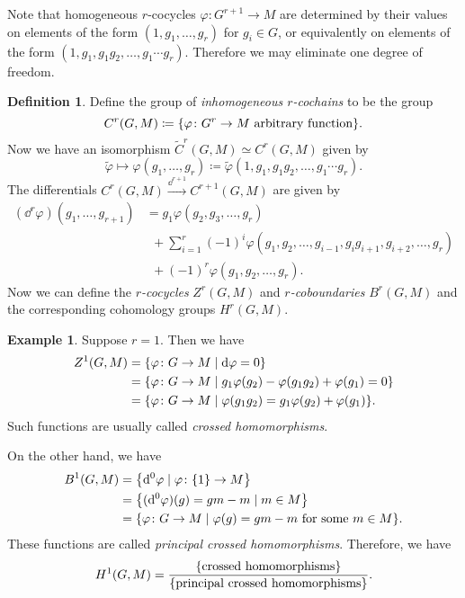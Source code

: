 \documentclass[leqno, openany]{memoir}
\theoremstyle{definition}
\newtheorem{defn}[thm]{Definition}
\newtheorem{exm}[thm]{Example}
\theoremstyle{remark}
\theoremstyle{plain}
\theoremstyle{definition}
\theoremstyle{remark}
\newcommand{\wt}[1]{\widetilde{#1}}
\begin{document}
Note that homogeneous $r$-cocycles $\varphi \colon G^{r+1} \to M$ are determined by their values on elements of the form $(1, g_1, \ldots, g_r)$ for $g_i \in G$, or equivalently on elements of the form $(1, g_1, g_1g_2, \ldots, g_1 \cdots g_r)$. Therefore we may eliminate one degree of freedom. 

\begin{defn}
    Define the group of \textit{inhomogeneous $r$-cochains} to be the group
    \[ C^r(G, M) \coloneqq \qty{\varphi \colon G^r \to M\ \text{arbitrary function}}. \]
    Now we have an isomorphism $\wt{C}^r(G, M) \simeq C^r(G, M)$ given by
    \[ \wt{\varphi} \mapsto \varphi(g_1, \ldots, g_r) \coloneqq \wt{\varphi}(1, g_1, g_1g_2, \ldots, g_1 \cdots g_r). \]
    The differentials $C^r(G, M) \xrightarrow{\dd^{r+1}} C^{r+1}(G, M)$ are given by
    \begin{align*} 
        (\dd^r \varphi)(g_1, \ldots, g_{r+1}) &= g_1 \varphi(g_2, g_3, \ldots, g_r) \\
                                              &\ \ + \sum_{i=1}^r {(-1)}^i \varphi(g_1, g_2, \ldots, g_{i-1}, g_i g_{i+1}, g_{i+2}, \ldots, g_r) \\
                                              &\ \ + {(-1)}^r \varphi(g_1, g_2, \ldots, g_r). 
    \end{align*}
    Now we can define the \textit{$r$-cocycles} $Z^r(G, M)$ and \textit{$r$-coboundaries} $B^r(G, M)$ and the corresponding cohomology groups $H^r(G, M)$.
\end{defn}

\begin{exm}
    Suppose $r = 1$. Then we have 
    \begin{align*}
        Z^1(G, M) &= \qty{\varphi \colon G \to M \mid \dd \varphi = 0} \\
                  &= \qty{\varphi \colon G \to M \mid g_1 \varphi(g_2) - \varphi(g_1g_2) + \varphi(g_1) = 0} \\
                  &= \qty{\varphi \colon G \to M \mid \varphi(g_1g_2) = g_1 \varphi(g_2) + \varphi(g_1)}.
    \end{align*}
    Such functions are usually called \textit{crossed homomorphisms}. 

    On the other hand, we have
    \begin{align*}
        B^1(G, M) &= \qty{\dd^0 \varphi \mid \varphi \colon \qty{1} \to M} \\
                  &= \qty{(\dd^0\varphi)(g) = gm - m \mid m \in M} \\
                  &= \qty{\varphi \colon G \to M \mid \varphi(g) = gm - m\ \text{for some $m \in M$}}. 
    \end{align*}
    These functions are called \textit{principal crossed homomorphisms}. Therefore, we have
    \[ H^1(G, M) = \frac{\qty{\text{crossed homomorphisms}}}{\qty{\text{principal crossed homomorphisms}}}. \]
\end{exm}
\end{document}
